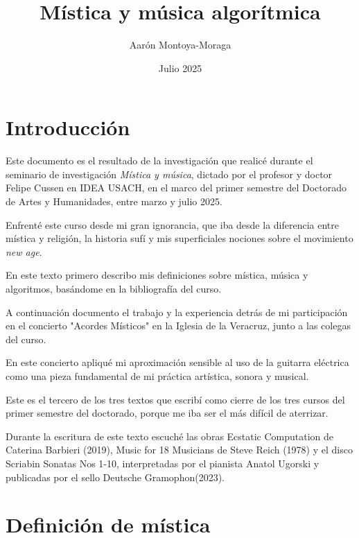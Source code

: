 \documentclass{article}
\title{Mística y música algorítmica}
\author{Aarón Montoya-Moraga}
\date{Julio 2025}
\begin{document}
\maketitle

\renewcommand*\contentsname{Tabla de contenidos}

\tableofcontents

\clearpage

\section{Introducción}

Este documento es el resultado de la investigación que realicé durante el seminario de investigación \textit{Mística y música}, dictado por el profesor y doctor Felipe Cussen en IDEA USACH, en el marco del primer semestre del Doctorado de Artes y Humanidades, entre marzo y julio 2025.

Enfrenté este curso desde mi gran ignorancia, que iba desde la diferencia entre mística y religión, la historia sufí y mis superficiales nociones sobre el movimiento \textit{new age}.

En este texto primero describo mis definiciones sobre mística, música y algoritmos, basándome en la bibliografía del curso. 

A continuación documento el trabajo y la experiencia detrás de mi participación en el concierto "Acordes Místicos" en la Iglesia de la Veracruz, junto a las colegas del curso.

En este concierto apliqué mi aproximación sensible al uso de la guitarra eléctrica como una pieza fundamental de mi práctica artística, sonora y musical.

Este es el tercero de los tres textos que escribí como cierre de los tres cursos del primer semestre del doctorado, porque me iba ser el más difícil de aterrizar.

Durante la escritura de este texto escuché las obras Ecstatic Computation de Caterina Barbieri (2019), Music for 18 Musicians de Steve Reich (1978) y el disco Scriabin Sonatas Nos 1-10, interpretadas por el pianista Anatol Ugorski y publicadas por el sello Deutsche Gramophon(2023).

\clearpage

\section{Definición de mística}


\clearpage
\end{document}
